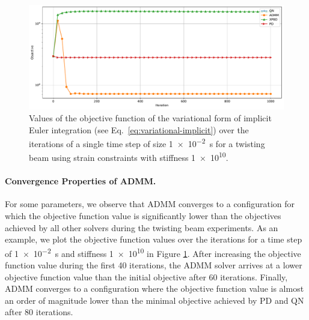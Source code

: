 \begin{figure}[h]
    \includegraphics[width=\textwidth]{figures/strain_beam_twist_objectives.pdf}
    \caption{Values of the objective function of the variational form of implicit Euler integration (see Eq.\ \ref{eq:variational-implicit}) over the iterations of 
        a single time step of size \SI{1e-2}{\second} for a twisting beam using strain constraints with stiffness \num{1e10}.}
    \label{fig:strain-beam-twist-objectives}
\end{figure}

\paragraph{Convergence Properties of ADMM.}
For some parameters, we observe that ADMM converges to a configuration for which the objective function value is significantly lower than the objectives 
achieved by all other solvers during the twisting beam experiments. As an example, we plot the objective function values over the iterations for a time step of 
\SI{1e-2}{\second} and stiffness \num{1e10} in Figure \ref{fig:strain-beam-twist-objectives}. After increasing the objective function value during the first 40 
iterations, the ADMM solver arrives at a lower objective function value than the initial objective after 60 iterations. Finally, ADMM 
converges to a configuration where the objective function value is almost an order of magnitude lower than the minimal objective achieved by PD and QN after 
80 iterations.

